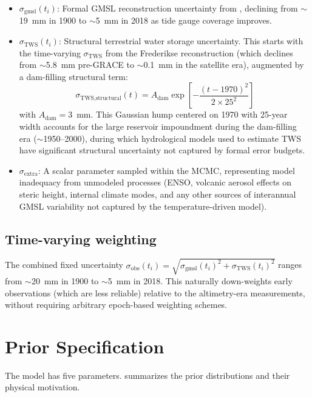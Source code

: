 \documentclass[11pt]{article}
\newcommand{\sigextra}{\sigma_{\text{extra}}}
\newcommand{\sigobs}{\sigma_{\text{obs}}}
\newcommand{\siggmsl}{\sigma_{\text{gmsl}}}
\newcommand{\sigtws}{\sigma_{\text{TWS}}}
\begin{document}
\begin{itemize}
  \item $\siggmsl(t_i)$: Formal GMSL reconstruction uncertainty from \citet{frederikse2020causes}, declining from $\sim$19~mm in 1900 to $\sim$5~mm in 2018 as tide gauge coverage improves.

  \item $\sigtws(t_i)$: Structural terrestrial water storage uncertainty.  This starts with the time-varying $\sigma_{\text{TWS}}$ from the Frederikse reconstruction (which declines from $\sim$5.8~mm pre-GRACE to $\sim$0.1~mm in the satellite era), augmented by a dam-filling structural term:
  \begin{equation}
    \sigma_{\text{TWS,structural}}(t) = A_{\text{dam}} \exp\!\left[-\frac{(t - 1970)^2}{2 \times 25^2}\right]
    \label{eq:dam}
  \end{equation}
  with $A_{\text{dam}} = 3$~mm.  This Gaussian hump centered on 1970 with 25-year width accounts for the large reservoir impoundment during the dam-filling era ($\sim$1950--2000), during which hydrological models used to estimate TWS have significant structural uncertainty not captured by formal error budgets.

  \item $\sigextra$: A scalar parameter sampled within the MCMC, representing model inadequacy from unmodeled processes (ENSO, volcanic aerosol effects on steric height, internal climate modes, and any other sources of interannual GMSL variability not captured by the temperature-driven model).
\end{itemize}

\subsection{Time-varying weighting}

The combined fixed uncertainty $\sigobs(t_i) = \sqrt{\siggmsl(t_i)^2 + \sigtws(t_i)^2}$ ranges from $\sim$20~mm in 1900 to $\sim$5~mm in 2018.  This naturally down-weights early observations (which are less reliable) relative to the altimetry-era measurements, without requiring arbitrary epoch-based weighting schemes.


\section{Prior Specification}

The model has five parameters.   summarizes the prior distributions and their physical motivation.
\end{document}
